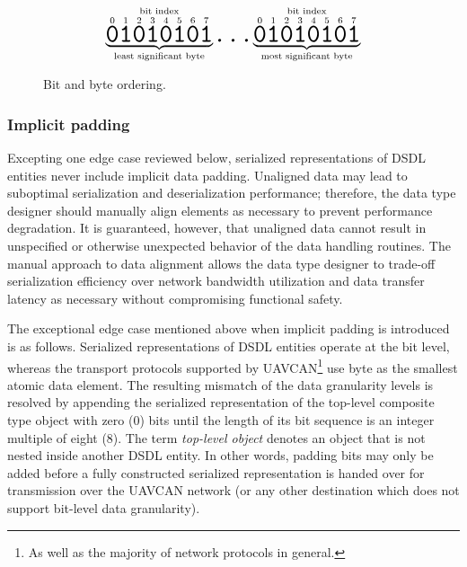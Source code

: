 \begin{figure}[H]
    $$
    \overset{\text{bit index}}{%
        \underbrace{%
            \overset{0}{\hugett{0}}
            \overset{1}{\hugett{1}}
            \overset{2}{\hugett{0}}
            \overset{3}{\hugett{1}}
            \overset{4}{\hugett{0}}
            \overset{5}{\hugett{1}}
            \overset{6}{\hugett{0}}
            \overset{7}{\hugett{1}}
        }_\text{least significant byte}%
    }
    \hugett{\ldots}
    \overset{\text{bit index}}{%
        \underbrace{%
            \overset{0}{\hugett{0}}
            \overset{1}{\hugett{1}}
            \overset{2}{\hugett{0}}
            \overset{3}{\hugett{1}}
            \overset{4}{\hugett{0}}
            \overset{5}{\hugett{1}}
            \overset{6}{\hugett{0}}
            \overset{7}{\hugett{1}}
        }_\text{most significant byte}%
    }
    $$
    \caption{Bit and byte ordering.\label{fig:dsdl_serialization_bit_ordering}}
\end{figure}

\subsubsection{Implicit padding}

Excepting one edge case reviewed below,
serialized representations of DSDL entities never include implicit data padding.
Unaligned data may lead to suboptimal serialization and deserialization performance;
therefore, the data type designer should manually align elements as necessary to prevent performance degradation.
It is guaranteed, however, that unaligned data cannot result in unspecified or otherwise unexpected behavior
of the data handling routines.
The manual approach to data alignment allows the data type designer to trade-off serialization efficiency
over network bandwidth utilization and data transfer latency as necessary without compromising functional safety.

The exceptional edge case mentioned above when implicit padding is introduced is as follows.
Serialized representations of DSDL entities operate at the bit level,
whereas the transport protocols supported by UAVCAN\footnote{As well as the majority of network protocols in general.}
use byte as the smallest atomic data element.
The resulting mismatch of the data granularity levels is resolved by
appending the serialized representation of the top-level composite type object with zero (0) bits
until the length of its bit sequence is an integer multiple of eight (8).
The term \emph{top-level object} denotes an object that is not nested inside another DSDL entity.
In other words, padding bits may only be added before a fully constructed serialized representation is
handed over for transmission over the UAVCAN network
(or any other destination which does not support bit-level data granularity).


